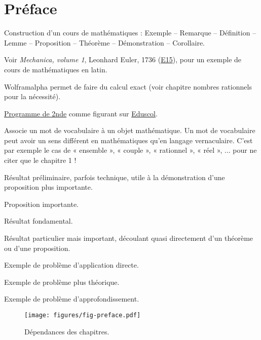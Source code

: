 
\chapter*{Préface}

Construction d'un cours de mathématiques : Exemple -- Remarque -- Définition -- Lemme -- Proposition -- Théorème -- Démonstration -- Corollaire.

Voir \emph{Mechanica, volume 1}, Leonhard Euler, 1736 (\href{https://scholarlycommons.pacific.edu/euler-works/15/}{E15}), pour un exemple de cours de mathématiques en latin.

Wolframalpha permet de faire du calcul exact (voir chapitre nombres rationnels pour la nécessité).

\href{https://eduscol.education.fr/document/24553/download}{Programme de 2nde} comme figurant sur 
\href{https://eduscol.education.fr/1723/programmes-et-ressources-en-mathematiques-voie-gt}{Eduscol}.

\begin{definition*}
Associe un mot de vocabulaire à un objet mathématique.
Un mot de vocabulaire peut avoir un sens différent en mathématiques qu'en langage vernaculaire.
C'est par exemple le cas de « ensemble », « couple », « rationnel », « réel », ... pour ne citer que le chapitre 1 !
\end{definition*}

\begin{lemme*}
	Résultat préliminaire, parfois technique, utile à la démonstration d'une proposition plus importante.
\end{lemme*}

\begin{proposition*}
	Proposition importante.
\end{proposition*}

\begin{theorem*}
	Résultat fondamental.
\end{theorem*}

\begin{corollaire*}
	Résultat particulier mais important, découlant quasi directement d'un théorème ou d'une proposition.
\end{corollaire*}

\begin{Exercise}[counter=preface]
	Exemple de problème d'application directe.
\end{Exercise}
\begin{Exercise}[difficulty=1, counter=preface]
	Exemple de problème plus théorique.
\end{Exercise}
\begin{Exercise}[difficulty=2, counter=preface]
	Exemple de problème d'approfondissement.
\end{Exercise}

\newpage
\begin{figure}
	\centering
	\texttt{[image: figures/fig-preface.pdf]}
	\caption{Dépendances des chapitres.}
\end{figure}
	